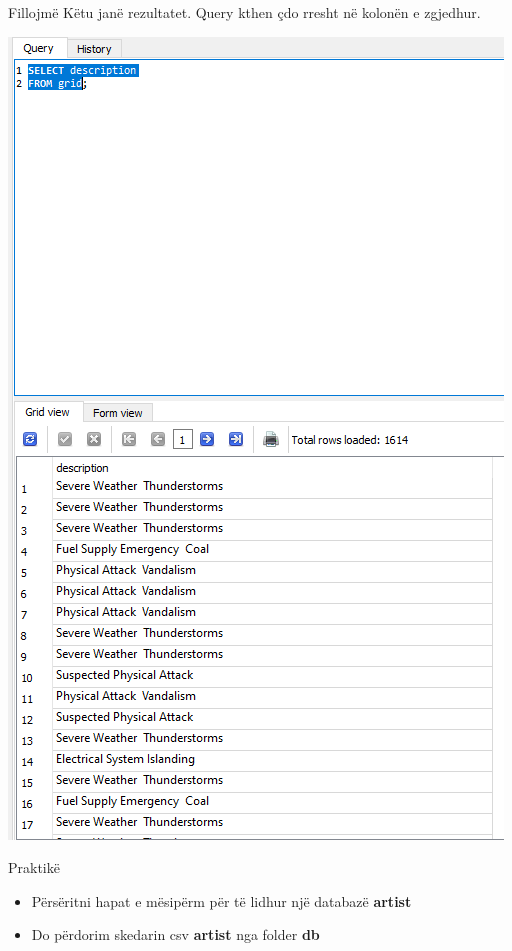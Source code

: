\documentclass[
  ignorenonframetext,
]{beamer}
\begin{document}
\begin{frame}{Fillojmë}
\label{fillojmuxeb-2}
Këtu janë rezultatet. Query kthen çdo rresht në kolonën e zgjedhur.

\includegraphics{./Figs/sql13.png}
\end{frame}

\begin{frame}{Praktikë}
\label{praktikuxeb}
\begin{itemize}
\item
  Përsëritni hapat e mësipërm për të lidhur një databazë \textbf{artist}
\item
  Do përdorim skedarin csv \textbf{artist} nga folder \textbf{db}
\end{itemize}
\end{frame}
\end{document}
